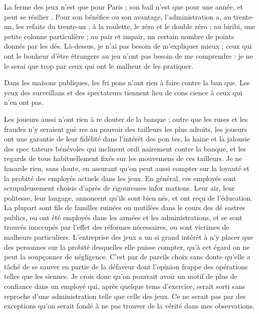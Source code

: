 La ferme des jeux n'est que pour
Paris ; son bail n'est que pour une
année, et peut se résilier \notemark.
Pour son bénéfice ou son avantage,
l'administration a, au trente-un, les 
refaits du trente-un ; à la roulette, le
zéro et le double zéro ; au biribi, une
petite colonne particulière ; au pair
et impair, un certain nombre de
points donnés par les dés. Là-dessus,
je n'ai pas besoin de m'expliquer
mieux ; ceux qui ont le bonheur d'être
étrangers au jeu n'ont pas besoin de
me comprendre : je ne le serai que
trop par ceux qui ont le malheur de
les pratiquer.

Dans les maisons publiques, les fri%
pons n'ont rien à faire contre la ban%
que. Les yeux des surveillans et des
spectateurs tiennent lieu de cons%
cience à ceux qui n'en ont pas.

Les joueurs aussi n'ont rien à re%
douter de la banque ; outre que les
ruses et les fraudes n'y seraient guè%
res au pouvoir des tailleurs les plus
adroits, les joueurs ont une garantie
de leur fidélité dans l'intérêt des pon%
tes, la haine et la jalousie des spec%
tateurs bénévoles qui inclinent ordi%
nairement contre la banque, et les
regards de tous habituellement fixés
sur les mouvemens de ces tailleurs.
Je ne hasarde rien, sans doute, en
assurant qu'on peut aussi compter sur
la loyauté et la probité des employés
actuels dans les jeux. En général,
ces employés sont scrupuleusement
choisis d'après de rigoureuses infor%
mations. Leur air, leur politesse, leur
langage, annoncent qu'ils sont bien
nés, et ont reçu de l'éducation. La
plupart sont fils de familles ruinées
ou mutilées dans le cours des dé%
sastres publics, ou ont été employés 
dans les armées et les administrations,
et se sont trouvés inoccupés par l'effet
des réformes nécessaires, ou sont
victimes de malheurs particuliers.
L'entreprise des jeux a un si grand
intérêt à n'y placer que des personnes
sur la probité desquelles elle puisse
compter, qu'à cet égard on ne peut
la soupçonner de négligence. C'est
par de pareils choix sans doute qu'elle
a tâché de se sauver en partie de la
défaveur dont l'opinion frappe des
opérations telles que les siennes. Je
crois donc qu'on pourrait avoir un
motif de plus de confiance dans un
employé qui, après quelque tems
d'exercice, serait sorti sans reproche
d'une administration telle que celle
des jeux. Ce ne serait pas par des
exceptions qu'on serait fondé à ne
pas trouver de la vérité dans mes
observations.

